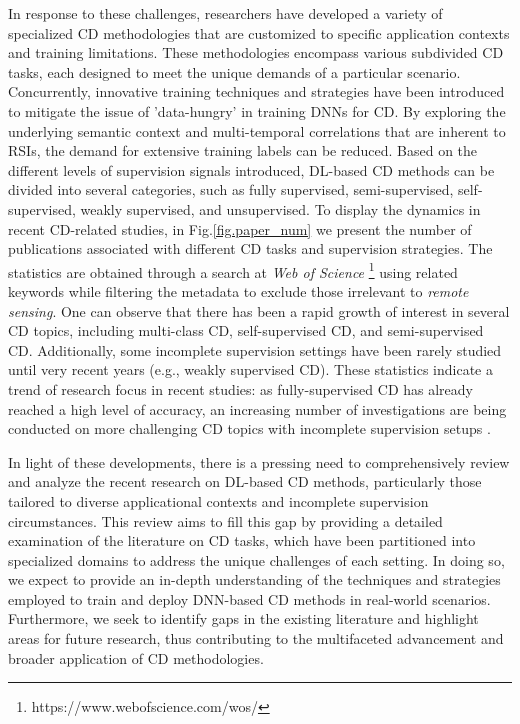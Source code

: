In response to these challenges, researchers have developed a variety of specialized CD methodologies that are customized to specific application contexts and training limitations. These methodologies encompass various subdivided CD tasks, each designed to meet the unique demands of a particular scenario. Concurrently, innovative training techniques and strategies have been introduced to mitigate the issue of 'data-hungry' in training DNNs for CD. By exploring the underlying semantic context and multi-temporal correlations that are inherent to RSIs, the demand for extensive training labels can be reduced. Based on the different levels of supervision signals introduced, DL-based CD methods can be divided into several categories, such as fully supervised, semi-supervised, self-supervised, weakly supervised, and unsupervised. To display the dynamics in recent CD-related studies, in Fig.\ref{fig.paper_num} we present the number of publications associated with different CD tasks and supervision strategies. The statistics are obtained through a search at \textit{Web of Science} \footnote{https://www.webofscience.com/wos/} using related keywords while filtering the metadata to exclude those irrelevant to \textit{remote sensing}. One can observe that there has been a rapid growth of interest in several CD topics, including multi-class CD, self-supervised CD, and semi-supervised CD. Additionally, some incomplete supervision settings have been rarely studied until very recent years (e.g., weakly supervised CD). These statistics indicate a trend of research focus in recent studies: as fully-supervised CD has already reached a high level of accuracy, an increasing number of investigations are being conducted on more challenging CD topics with incomplete supervision setups \cite{cheng2023change}.

In light of these developments, there is a pressing need to comprehensively review and analyze the recent research on DL-based CD methods, particularly those tailored to diverse applicational contexts and incomplete supervision circumstances. This review aims to fill this gap by providing a detailed examination of the literature on CD tasks, which have been partitioned into specialized domains to address the unique challenges of each setting. In doing so, we expect to provide an in-depth understanding of the techniques and strategies employed to train and deploy DNN-based CD methods in real-world scenarios. Furthermore, we seek to identify gaps in the existing literature and highlight areas for future research, thus contributing to the multifaceted advancement and broader application of CD methodologies. 


